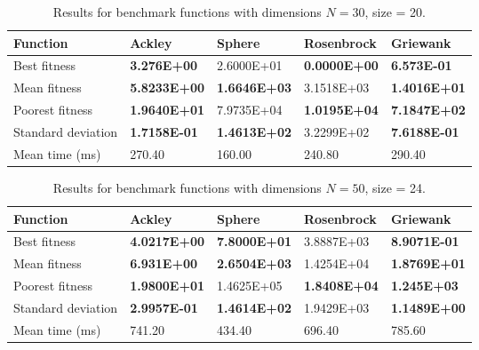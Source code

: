 \documentclass[KomodoMain.tex]{subfiles}
\begin{document}
\begin{table}[!htbp]
\small
\caption{\small Results for benchmark functions with dimensions $N = 30$, size = 20.}
\label{table:X}
\begin{tabular}{ p{3cm} p{2.4cm} p{2.4cm} p{2.4cm} p{2.4cm}}
 \hline
 Function   & Ackley  & Sphere & Rosenbrock & Griewank \\
 \hline
 Best fitness   & \textbf{3.276E+00} & 2.6000E+01 & \textbf{0.0000E+00} & \textbf{6.573E-01} \\
 
 Mean fitness & \textbf{5.8233E+00} & \textbf{1.6646E+03} & 3.1518E+03 & \textbf{1.4016E+01} \\
 
 Poorest fitness & \textbf{1.9640E+01} & 7.9735E+04 & \textbf{1.0195E+04} & \textbf{7.1847E+02} \\
 
 Standard deviation & \textbf{1.7158E-01} & \textbf{1.4613E+02} & 3.2299E+02 & \textbf{7.6188E-01} \\
 
 Mean time (ms) & 270.40 & 160.00 & 240.80 & 290.40 \\
 \hline
\end{tabular}
\end{table}


\begin{table}[!htbp]
\small
\caption{ \small Results for benchmark functions with dimensions $N = 50$, size = 24.}
\label{table:X}
\begin{tabular}{ p{3cm} p{2.4cm} p{2.4cm} p{2.4cm} p{2.4cm}}
 \hline
 Function   & Ackley  & Sphere & Rosenbrock & Griewank \\
 \hline
 Best fitness   & \textbf{4.0217E+00} & \textbf{7.8000E+01} &  3.8887E+03 & \textbf{8.9071E-01} \\
 
 Mean fitness & \textbf{6.931E+00} & \textbf{2.6504E+03} & 1.4254E+04 & \textbf{1.8769E+01} \\
 
 Poorest fitness & \textbf{1.9800E+01} & 1.4625E+05 & \textbf{1.8408E+04} & \textbf{1.245E+03} \\
 
 Standard deviation & \textbf{2.9957E-01} & \textbf{1.4614E+02} & 1.9429E+03 & \textbf{1.1489E+00} \\
 
 Mean time (ms) & 741.20 & 434.40 & 696.40 & 785.60 \\
 \hline
\end{tabular}
\end{table}
\end{document}
